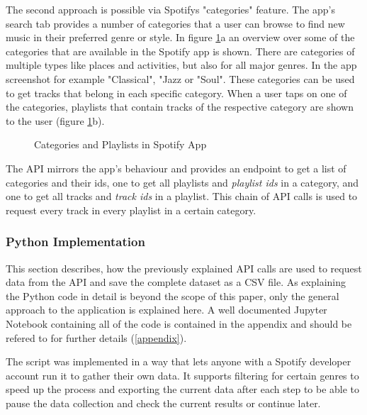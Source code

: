 The second approach is possible via Spotifys "categories" feature. The app's search tab provides a number of
categories that a user can browse to find new music in their preferred genre or style.
In figure \ref{fig:Categories and Playlists in Spotify App}a an overview over some of the categories
that are available in the Spotify app is shown. There are categories of multiple types like
places and activities, but also for all major genres. In the app screenshot
for example "Classical", "Jazz or "Soul".
These categories can be used to get tracks that belong in each specific category. When a user taps on
one of the categories, playlists that contain tracks of the respective category are shown to the user
(figure \ref{fig:Categories and Playlists in Spotify App}b).

\begin{figure}[H]
    \centering
    \qquad
    \caption{Categories and Playlists in Spotify App}%
    \label{fig:Categories and Playlists in Spotify App}%
\end{figure}

The API mirrors the app's behaviour and provides an endpoint to get a list of categories and their ids,
one to get all playlists and \emph{playlist ids} in a category, and one to get all tracks and \emph{track ids} in
a playlist. This chain of API calls is used to request every track in every playlist in a certain category.


\subsubsection{Python Implementation}

This section describes, how the previously explained API calls are used to request data from the API
and save the complete dataset as a CSV file.
As explaining the Python code in detail is beyond the scope of this paper, only the general 
approach to the application is explained here. 
A well documented Jupyter Notebook containing all of the code is contained in the appendix and should be
refered to for further details (\ref{appendix}).

The script was implemented in a way that lets anyone with a Spotify
developer account run it to gather their own data.
It supports filtering for certain genres to speed up the process and exporting the current data after each step
to be able to pause the data collection and check the current results or continue later.

